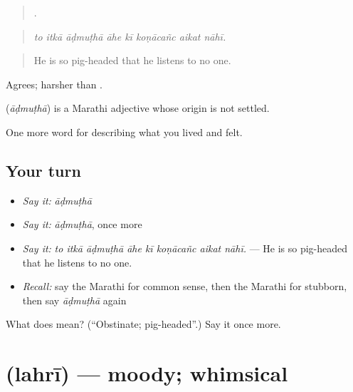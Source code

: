 \begin{quote}
       .
\end{quote}

\begin{quote}
\emph{to itkā āḍmuṭhā āhe kī koṇācañc aikat nāhī.}
\end{quote}

\begin{quote}
He is so pig-headed that he listens to no one.
\end{quote}

Agrees; harsher than .

\begin{cousinweb}
\textbf{} (\emph{āḍmuṭhā}) is a Marathi adjective whose origin is not settled.
\end{cousinweb}

\begin{grammarlens}[title={What you've built}]
One more word for describing what you lived and felt.
\end{grammarlens}

\subsection*{Your turn}
\begin{itemize}
\raggedright
  \item \emph{Say it:} \emph{āḍmuṭhā}
  \item \emph{Say it:} \emph{āḍmuṭhā}, once more
  \item \emph{Say it:} \emph{to itkā āḍmuṭhā āhe kī koṇācañc aikat nāhī.} — He is so pig-headed that he listens to no one.
  \item \emph{Recall:} say the Marathi for common sense, then the Marathi for stubborn, then say \emph{āḍmuṭhā} again
\end{itemize}

\begin{tcolorbox}[breakable,colback=teal!4,colframe=teal!35!black,title={Before you move on}]
What does  mean? (\textquotedblleft{}Obstinate; pig-headed\textquotedblright{}.) Say it once more.
\end{tcolorbox}
\section[\texorpdfstring{\mr{लहरी} (lahrī)}{लहरी (lahrī)}]{ (lahrī) — moody; whimsical}

